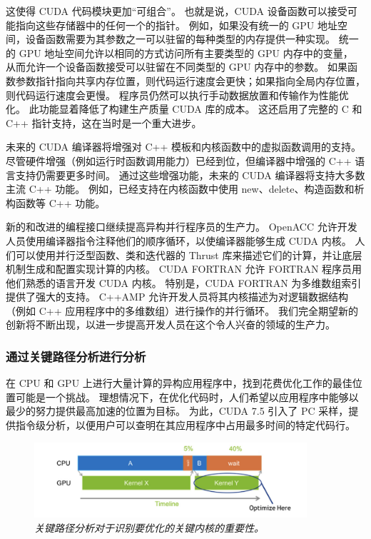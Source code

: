 这使得 CUDA 代码模块更加“可组合”。 也就是说，CUDA 设备函数可以接受可能指向这些存储器中的任何一个的指针。 
例如，如果没有统一的 GPU 地址空间，设备函数需要为其参数之一可以驻留的每种类型的内存提供一种实现。 
统一的 GPU 地址空间允许以相同的方式访问所有主要类型的 GPU 内存中的变量，
从而允许一个设备函数接受可以驻留在不同类型的 GPU 内存中的参数。 
如果函数参数指针指向共享内存位置，则代码运行速度会更快；如果指向全局内存位置，则代码运行速度会更慢。 
程序员仍然可以执行手动数据放置和传输作为性能优化。 此功能显着降低了构建生产质量 CUDA 库的成本。 
这还启用了完整的 C 和 C++ 指针支持，这在当时是一个重大进步。

未来的 CUDA 编译器将增强对 C++ 模板和内核函数中的虚拟函数调用的支持。 
尽管硬件增强（例如运行时函数调用能力）已经到位，但编译器中增强的 C++ 语言支持仍需要更多时间。 
通过这些增强功能，未来的 CUDA 编译器将支持大多数主流 C++ 功能。 
例如，已经支持在内核函数中使用 new、delete、构造函数和析构函数等 C++ 功能。

新的和改进的编程接口继续提高异构并行程序员的生产力。 
OpenACC 允许开发人员使用编译器指令注释他们的顺序循环，以使编译器能够生成 CUDA 内核。 
人们可以使用并行泛型函数、类和迭代器的 Thrust 库来描述它们的计算，并让底层机制生成和配置实现计算的内核。 
CUDA FORTRAN 允许 FORTRAN 程序员用他们熟悉的语言开发 CUDA 内核。 
特别是，CUDA FORTRAN 为多维数组索引提供了强大的支持。 
C++AMP 允许开发人员将其内核描述为对逻辑数据结构（例如 C++ 应用程序中的多维数组）进行操作的并行循环。 
我们完全期望新的创新将不断出现，以进一步提高开发人员在这个令人兴奋的领域的生产力。

\subsubsection{通过关键路径分析进行分析}
在 CPU 和 GPU 上进行大量计算的异构应用程序中，找到花费优化工作的最佳位置可能是一个挑战。 
理想情况下，在优化代码时，人们希望以应用程序中能够以最少的努力提供最高加速的位置为目标。 
为此，CUDA 7.5 引入了 PC 采样，提供指令级分析，以便用户可以查明在其应用程序中占用最多时间的特定代码行。

\begin{figure}[H]
	\centering
	\includegraphics[width=0.9\textwidth]{figs/F22.2.png}
	\caption{\textit{关键路径分析对于识别要优化的关键内核的重要性。}}
\end{figure}

